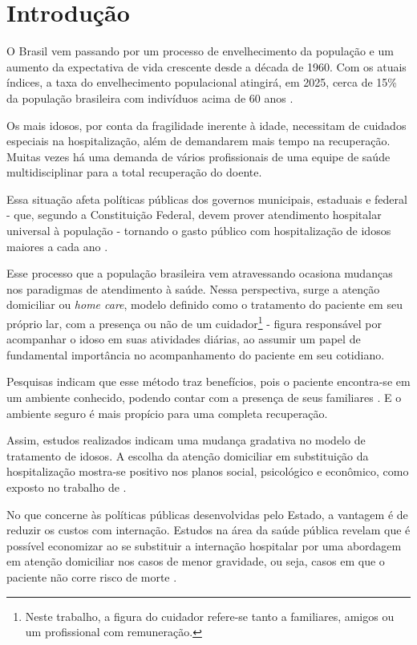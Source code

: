 \chapter{Introdução}\label{cap:introducao}

O Brasil vem passando por um processo de envelhecimento da população e
um aumento da expectativa de vida crescente desde a década de 1960. 
Com os atuais índices, a taxa do envelhecimento populacional atingirá, 
em 2025, cerca de 15\% da população brasileira com indivíduos acima 
de 60 anos \cite{gonccalves2006perfil}. 

Os mais idosos, por conta da fragilidade inerente à idade, necessitam de 
cuidados especiais na hospitalização, além de demandarem mais tempo na 
recuperação. Muitas vezes há uma demanda de vários profissionais de uma equipe 
de saúde multidisciplinar para a total recuperação do doente.

Essa situação afeta políticas públicas dos governos municipais, estaduais e
federal - que, segundo a Constituição Federal, devem prover atendimento
hospitalar universal à população - tornando o gasto público com hospitalização
de idosos maiores a cada ano \cite{da2013gastos}.

Esse processo que a população brasileira vem atravessando ocasiona
mudanças  nos paradigmas de atendimento à saúde. Nessa perspectiva, surge a
atenção domiciliar ou \textit{home care}, modelo definido como o tratamento do
paciente em seu próprio lar, com a presença ou não de um
cuidador\footnote{Neste trabalho, a figura do cuidador refere-se tanto a
familiares, amigos ou um profissional com remuneração.} - figura responsável por
acompanhar o idoso em suas atividades diárias, ao assumir um papel de
fundamental importância no acompanhamento do paciente em seu cotidiano.

Pesquisas indicam que esse método traz benefícios, pois o  paciente encontra-se
em um ambiente conhecido, podendo contar com a presença de seus familiares
\cite{hermann2007atendimento, day2010beneficios}. E o ambiente seguro é mais
propício para uma completa recuperação.

Assim, estudos realizados indicam uma mudança gradativa no modelo de tratamento
de idosos. A escolha da atenção domiciliar em substituição da hospitalização 
mostra-se positivo nos planos social, psicológico e econômico, como exposto
no trabalho de .

No que concerne às políticas públicas desenvolvidas pelo Estado,  a vantagem é
de reduzir os custos com internação. Estudos na área da saúde pública revelam
que é possível economizar ao se substituir a internação hospitalar por uma
abordagem em atenção domiciliar nos casos de menor gravidade,  ou seja, casos
em que o paciente não corre risco de morte \cite{bourdette1993health}.  

